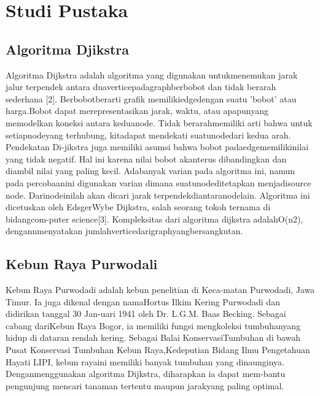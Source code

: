 \documentclass[conference]{IEEEtran}
\begin{document}
\section{Studi Pustaka}

\subsection{Algoritma Djikstra}

\begin{figure}[htbp]
	\centering
	\resizebox{0.5\textwidth}{!}{}
\end{figure}

Algoritma Dijkstra adalah algoritma yang digunakan untukmenemukan  jarak  jalur  terpendek  antara  duaverticepadagraphberbobot  dan  tidak  berarah  sederhana  [2].  Berbobotberarti grafik memilikiedgedengan suatu ’bobot’ atau harga.Bobot  dapat  merepresentasikan  jarak,  waktu,  atau  apapunyang  memodelkan  koneksi  antara  keduanode.  Tidak  berarahmemiliki  arti  bahwa  untuk  setiapnodeyang  terhubung,  kitadapat mendekati suatunodedari kedua arah. Pendekatan Di-jikstra juga memiliki asumsi bahwa bobot padaedgememilikinilai  yang  tidak  negatif.  Hal  ini  karena  nilai  bobot  akanterus  dibandingkan  dan  diambil  nilai  yang  paling  kecil.  Adabanyak  varian  pada  algoritma  ini,  namun  pada  percobaanini  digunakan  varian  dimana  suatunodeditetapkan  menjadisource node.  Darinodeinilah  akan  dicari  jarak  terpendekdiantaranodelain.  Algoritma  ini  dicetuskan  oleh  EdsgerWybe  Dijkstra,  salah  seorang  tokoh  ternama  di  bidangcom-puter science[3]. Kompleksitas dari algoritma dijkstra adalahO(n2), dengannmenyatakan jumlahverticedarigraphyangbersangkutan.

\subsection{Kebun Raya Purwodali}
Kebun  Raya  Purwodadi  adalah  kebun  penelitian  di  Keca-matan  Purwodadi,  Jawa  Timur.  Ia  juga  dikenal  dengan  namaHortus Ilkim Kering Purwodadi dan didirikan tanggal 30 Jan-uari 1941 oleh Dr. L.G.M. Baas Becking. Sebagai cabang dariKebun Raya Bogor, ia memiliki fungsi mengkoleksi tumbuhanyang hidup di dataran rendah kering. Sebagai Balai KonservasiTumbuhan di bawah Pusat Konservasi Tumbuhan Kebun Raya,Kedeputian Bidang Ilmu Pengetahuan Hayati LIPI, kebun rayaini  memiliki  banyak  tumbuhan  yang  dinaunginya.  Denganmenggunakan  algoritma  Dijkstra,  diharapkan  ia  dapat  mem-bantu  pengunjung  mencari  tanaman  tertentu  maupun  jarakyang paling optimal.
\end{document}
